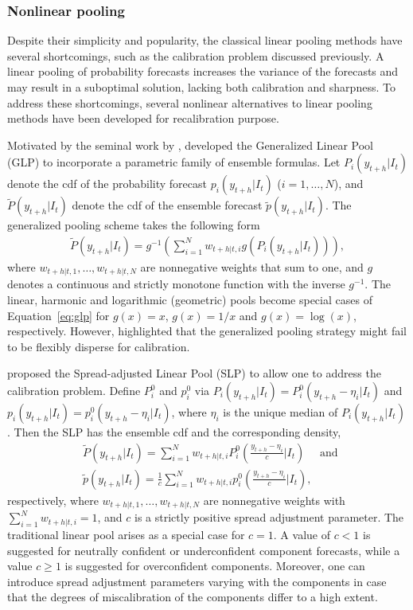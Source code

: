 \documentclass[11pt]{article}
\begin{document}
\subsubsection{Nonlinear pooling}
\label{sec:nonlinear_pooling}

Despite their simplicity and popularity, the classical linear pooling methods have several shortcomings, such as the calibration problem discussed previously. A linear pooling of probability forecasts increases the variance of the forecasts and may result in a suboptimal solution, lacking both calibration and sharpness. To address these shortcomings, several nonlinear alternatives to linear pooling methods have been developed for recalibration purpose.

Motivated by the seminal work by \cite{Dawid1995-jj}, \cite{Gneiting2013-hl} developed the Generalized Linear Pool (GLP) to incorporate a parametric family of ensemble formulas. Let $P_{i}(y_{t+h}|I_{t})$ denote the cdf of the probability forecast $p_{i}(y_{t+h}|I_{t})$ ($i=1,\ldots,N$), and $\tilde{P}(y_{t+h}|I_{t})$ denote the cdf of the ensemble forecast $\tilde{p}(y_{t+h}|I_{t})$. The generalized pooling scheme takes the following form
\begin{align}
\label{eq:glp}
\tilde{P}(y_{t+h}|I_{t}) = g^{-1}\left(\sum_{i=1}^{N} w_{t+h|t,i} g\left(P_{i}(y_{t+h}|I_{t})\right)\right),
\end{align}
where $w_{t+h|t,1},\ldots,w_{t+h|t,N}$ are nonnegative weights that sum to one, and $g$ denotes a continuous and strictly monotone function with the inverse $g^{-1}$. The linear, harmonic and logarithmic (geometric) pools become special cases of Equation~\eqref{eq:glp} for $g(x)=x$, $g(x)=1/x$ and $g(x)=\log(x)$, respectively. However, \cite{Gneiting2013-hl} highlighted that the generalized pooling strategy might fail to be flexibly disperse for calibration.

\cite{Gneiting2013-hl} proposed the Spread-adjusted Linear Pool (SLP) to allow one to address the calibration problem. Define $P_{i}^{0}$ and $p_{i}^{0}$ via $P_{i}(y_{t+h}|I_{t})=P_{i}^{0}(y_{t+h}-\eta_{i}|I_{t})$ and $p_{i}(y_{t+h}|I_{t})=p_{i}^{0}(y_{t+h}-\eta_{i}|I_{t})$, where $\eta_{i}$ is the unique median of $P_{i}(y_{t+h}|I_{t})$. Then the SLP has the ensemble cdf and the corresponding density,
\begin{align*}
&\tilde{P}(y_{t+h}|I_{t})=\sum_{i=1}^{N} w_{t+h|t,i} P_{i}^{0}\left(\frac{y_{t+h}-\eta_{i}}{c}\bigg|I_{t}\right) \quad \text { and }\\
&\tilde{p}(y_{t+h}|I_{t})=\frac{1}{c} \sum_{i=1}^{N} w_{t+h|t,i} p_{i}^{0}\left(\frac{y_{t+h}-\eta_{i}}{c}\bigg|I_{t}\right),
\end{align*}
respectively, where $w_{t+h|t,1},\ldots,w_{t+h|t,N}$ are nonnegative weights with $\sum_{i=1}^{N}w_{t+h|t,i}=1$, and $c$ is a strictly positive spread adjustment parameter. The traditional linear pool arises as a special case for $c = 1$. A value of $c < 1$ is suggested for neutrally confident or underconfident component forecasts, while a value $c \geq 1$ is suggested for overconfident components. Moreover, one can introduce spread adjustment parameters varying with the components in case that the degrees of miscalibration of the components differ to a high extent.
\end{document}
